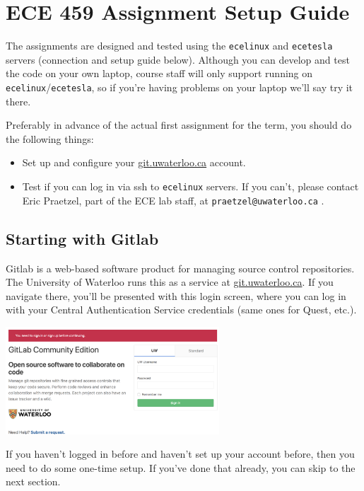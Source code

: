 \documentclass[letterpaper,10pt]{article}
\begin{document}
\section*{ECE 459 Assignment Setup Guide}

The assignments are designed and tested using the \texttt{ecelinux} and \texttt{ecetesla} servers (connection and setup guide below). Although you can develop and test the code on your own laptop, course staff will only support running on \texttt{ecelinux}/\texttt{ecetesla}, so if you're having problems on your laptop we'll say try it there. 

Preferably in advance of the actual first assignment for the term, you should do the following things:
\begin{itemize}
	\item Set up and configure your \url{git.uwaterloo.ca} account.
	\item Test if you can log in via ssh to \texttt{ecelinux} servers. If you can't, please contact Eric Praetzel, part of the ECE lab staff,  at \texttt{praetzel@uwaterloo.ca} .
\end{itemize}

\subsection*{Starting with Gitlab}
Gitlab is a web-based software product for managing source control repositories. The University of Waterloo runs this as a service at \url{git.uwaterloo.ca}. If you navigate there, you'll be presented with this login screen, where you can log in with your Central Authentication Service credentials (same ones for Quest, etc.). 

\begin{center}
	\includegraphics[width=0.6\textwidth]{images/gitlab-login.png}
\end{center}

If you haven't logged in before and haven't set up your account before, then you need to do some one-time setup. If you've done that already, you can skip to the next section.
\end{document}
